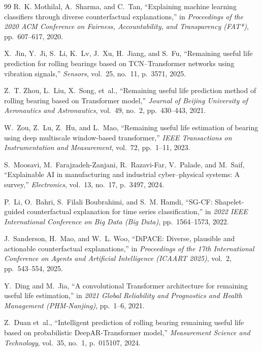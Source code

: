 \begin{thebibliography}{99}
R.~K. Mothilal, A.~Sharma, and C.~Tan,
``Explaining machine learning classifiers through diverse counterfactual explanations,''
in \textit{Proceedings of the 2020 ACM Conference on Fairness, Accountability, and Transparency (FAT*)},
pp.~607--617, 2020.

X.~Jin, Y.~Ji, S.~Li, K.~Lv, J.~Xu, H.~Jiang, and S.~Fu,
``Remaining useful life prediction for rolling bearings based on TCN--Transformer networks using vibration signals,''
\textit{Sensors}, vol.~25, no.~11, p.~3571, 2025.

Z.~T. Zhou, L.~Liu, X.~Song, et~al.,
``Remaining useful life prediction method of rolling bearing based on Transformer model,''
\textit{Journal of Beijing University of Aeronautics and Astronautics}, vol.~49, no.~2, pp.~430--443, 2021.

W.~Zou, Z.~Lu, Z.~Hu, and L.~Mao,
``Remaining useful life estimation of bearing using deep multiscale window-based transformer,''
\textit{IEEE Transactions on Instrumentation and Measurement}, vol.~72, pp.~1--11, 2023.

S.~Moosavi, M.~Farajzadeh-Zanjani, R.~Razavi-Far, V.~Palade, and M.~Saif,
``Explainable AI in manufacturing and industrial cyber--physical systems: A survey,''
\textit{Electronics}, vol.~13, no.~17, p.~3497, 2024.

P.~Li, O.~Bahri, S.~Filali Boubrahimi, and S.~M. Hamdi,
``SG-CF: Shapelet-guided counterfactual explanation for time series classification,''
in \textit{2022 IEEE International Conference on Big Data (Big Data)}, pp.~1564--1573, 2022.

J.~Sanderson, H.~Mao, and W.~L. Woo,
``DiPACE: Diverse, plausible and actionable counterfactual explanations,''
in \textit{Proceedings of the 17th International Conference on Agents and Artificial Intelligence (ICAART 2025)},
vol.~2, pp.~543--554, 2025.

Y.~Ding and M.~Jia,
``A convolutional Transformer architecture for remaining useful life estimation,''
in \textit{2021 Global Reliability and Prognostics and Health Management (PHM-Nanjing)},
pp.~1--6, 2021.

Z.~Duan et~al.,
``Intelligent prediction of rolling bearing remaining useful life based on probabilistic DeepAR-Transformer model,''
\textit{Measurement Science and Technology}, vol.~35, no.~1, p.~015107, 2024.



\end{thebibliography}
